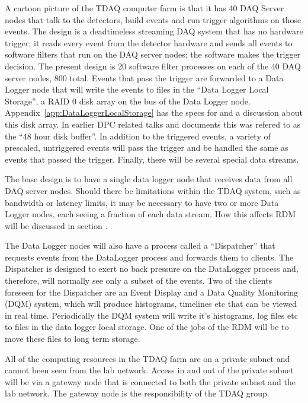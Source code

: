 A cartoon picture of the TDAQ computer farm is that it has 40 DAQ Server nodes
that talk to the detectors, build events and run trigger algorithms on those events.
The design is a deadtimeless streaming DAQ system that has no hardware trigger;
it reads every event from the detector hardware and sends all events to software filters
that run on the DAQ server nodes;
the software makes the trigger decision.
The present design is 20 software filter processes on each of the 40 DAQ server nodes, 800 total.
Events that pass the trigger are forwarded to a Data Logger node that will write the events
to files in the ``Data Logger Local Storage'', a RAID 0 disk array on the bus of the Data Logger node.
Appendix~\ref{app:DataLoggerLocalStorage} has the specs for and a discussion about this disk array.
In earlier DPC related talks and documents this was refered to as the ``48 hour disk buffer''.
In addition to the triggered events, a variety of prescaled, untriggered events will pass the
trigger and be handled the same as events that passed the trigger.
Finally, there will be several special data streams.

The base design is to have a single data logger node that receives data from all DAQ server nodes.
Should there be limitations within the TDAQ system, such as bandwidth or latency limits,
it may be necessary to have two or more Data Logger nodes, each seeing a fraction of each data stream.
How this affects RDM will be discussed in section .

The Data Logger nodes will also have a process called a ``Dispatcher''
that requests events from the DataLogger process
and forwards them to clients.
The Dispatcher is designed to exert no back pressure on the DataLogger process
and, therefore, will normally see only a subset of the events.
Two of the clients foreseen for the Dispatcher are an Event Display and
a Data Quality Monitoring (DQM) system,
which will produce histograms, timelines etc that can be viewed in real time.
Periodically the DQM system will write it's histograms, log files etc to
files in the data logger local storage.  One of the jobs of the RDM will be
to move these files to long term storage.

All of the computing resources in the TDAQ farm are on a private subnet
and cannot been seen from the lab network.  Access in and out
of the private subnet will be via a gateway node that is connected to
both the private subnet and the lab network.  The gateway node is the responsibility
of the TDAQ group.


